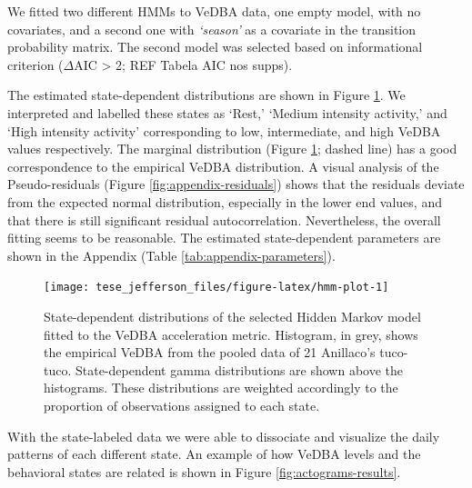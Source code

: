 \documentclass[english,msc,numbers,hidelinks]{coppe}
\begin{document}
  We fitted two different HMMs to VeDBA data, one empty model, with no covariates, and a second one with \emph{`season'} as a covariate in the transition probability matrix. The second model was selected based on informational criterion (\(\Delta\)AIC \textgreater{} 2; REF Tabela AIC nos supps).

  The estimated state-dependent distributions are shown in Figure \ref{fig:hmm-plot}. We interpreted and labelled these states as `Rest,' `Medium intensity activity,' and `High intensity activity' corresponding to low, intermediate, and high VeDBA values respectively. The marginal distribution (Figure \ref{fig:hmm-plot}; dashed line) has a good correspondence to the empirical VeDBA distribution. A visual analysis of the Pseudo-residuals (Figure \ref{fig:appendix-residuals}) shows that the residuals deviate from the expected normal distribution, especially in the lower end values, and that there is still significant residual autocorrelation. Nevertheless, the overall fitting seems to be reasonable. The estimated state-dependent parameters are shown in the Appendix (Table \ref{tab:appendix-parameters}). \newline
  \begin{figure}[H]

  {\centering \texttt{[image: tese\_jefferson\_files/figure-latex/hmm-plot-1]} 

  }

  \caption{State-dependent distributions of the selected Hidden Markov model fitted to the VeDBA acceleration metric. Histogram, in grey, shows the empirical VeDBA from the pooled data of 21 Anillaco's tuco-tuco. State-dependent gamma distributions are shown above the histograms. These distributions are weighted accordingly to the proportion of observations assigned to each state.}\label{fig:hmm-plot}
  \end{figure}
  With the state-labeled data we were able to dissociate and visualize the daily patterns of each different state. An example of how VeDBA levels and the behavioral states are related is shown in Figure \ref{fig:actograms-results}.
\end{document}
